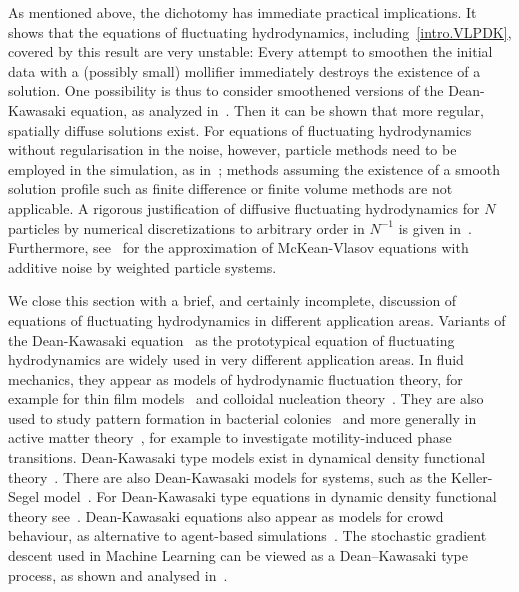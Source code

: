 \documentclass{article}
\begin{document}
As mentioned above, the dichotomy has immediate practical implications. It shows that the equations of
fluctuating hydrodynamics, including~\eqref{intro.VLPDK}, covered by this result are very unstable: Every
attempt to smoothen the initial data with a (possibly small) mollifier immediately destroys the existence of a
solution.  One possibility is thus to consider smoothened versions of the Dean-Kawasaki equation, as analyzed
in~\cite{Cornalba2019a, Djurdjevac2024a, Fehrman2024a, Mariani2010a}. Then it can be shown that more regular,
spatially diffuse solutions exist. For equations of fluctuating hydrodynamics without regularisation in the
noise, however, particle methods need to be employed in the simulation, as in~\cite{Embacher2018a,Huang2025a};
methods assuming the existence of a smooth solution profile such as finite difference or finite volume methods
are not applicable. A rigorous justification of diffusive fluctuating hydrodynamics for $N$ particles by
numerical discretizations to arbitrary order in $N^{-1}$ is given in~\cite{Cornalba2023a}. Furthermore,
see~\cite{Angeli2024aTR} for the approximation of McKean-Vlasov equations with additive noise by weighted
particle systems.

We close this section with a brief, and certainly incomplete, discussion of equations of fluctuating
hydrodynamics in different application areas. Variants of the Dean-Kawasaki equation~\cite{Dean1996a} as the
prototypical equation of fluctuating hydrodynamics are widely used in very different application areas. In
fluid mechanics, they appear as models of hydrodynamic fluctuation theory, for example for thin film
models~\cite{Grun2006a} and colloidal nucleation theory~\cite{Lutsko2012a}. They are also used to study
pattern formation in bacterial colonies~\cite{Cates2010a} and more generally in active matter
theory~\cite{Cates2015a}, for example to investigate motility-induced phase transitions. Dean-Kawasaki type
models exist in dynamical density functional theory~\cite{Vrugt2020b}. There are also Dean-Kawasaki models for
systems, such as the Keller-Segel model~\cite{Martini2024aTR}. For Dean-Kawasaki type equations in dynamic
density functional theory see~\cite{Donev2014b}. Dean-Kawasaki equations also appear as models for crowd
behaviour, as alternative to agent-based simulations~\cite{Helfmann2021a}. The stochastic gradient descent
used in Machine Learning can be viewed as a Dean--Kawasaki type process, as shown and analysed
in~\cite{Rotskoff2022a,Gess2022aTR}.

\nocite{Bressloff2024a}
\end{document}
